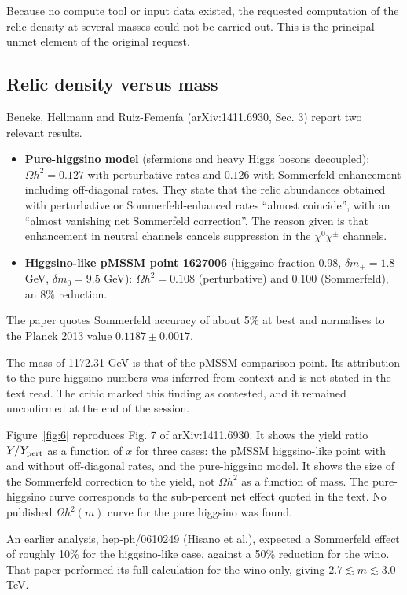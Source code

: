 \documentclass[11pt,a4paper]{article}
\begin{document}
Because no compute tool or input data existed, the requested computation of the relic density at several masses could not be carried out. This is the principal unmet element of the original request.

\subsection{Relic density versus mass}
Beneke, Hellmann and Ruiz-Femen\'ia (arXiv:1411.6930, Sec. 3) report two relevant results.
\begin{itemize}
\item \textbf{Pure-higgsino model} (sfermions and heavy Higgs bosons decoupled): $\Omega h^2 = 0.127$ with perturbative rates and $0.126$ with Sommerfeld enhancement including off-diagonal rates. They state that the relic abundances obtained with perturbative or Sommerfeld-enhanced rates ``almost coincide'', with an ``almost vanishing net Sommerfeld correction''. The reason given is that enhancement in neutral channels cancels suppression in the $\chi^0\chi^\pm$ channels.
\item \textbf{Higgsino-like pMSSM point 1627006} (higgsino fraction 0.98, $\delta m_+ = 1.8$ GeV, $\delta m_0 = 9.5$ GeV): $\Omega h^2 = 0.108$ (perturbative) and $0.100$ (Sommerfeld), an 8\% reduction.
\end{itemize}
The paper quotes Sommerfeld accuracy of about 5\% at best and normalises to the Planck 2013 value $0.1187\pm0.0017$.

The mass of 1172.31 GeV is that of the pMSSM comparison point. Its attribution to the pure-higgsino numbers was inferred from context and is not stated in the text read. The critic marked this finding as contested, and it remained unconfirmed at the end of the session.






Figure~\ref{fig:6} reproduces Fig. 7 of arXiv:1411.6930. It shows the yield ratio $Y/Y_{\rm pert}$ as a function of $x$ for three cases: the pMSSM higgsino-like point with and without off-diagonal rates, and the pure-higgsino model. It shows the size of the Sommerfeld correction to the yield, not $\Omega h^2$ as a function of mass. The pure-higgsino curve corresponds to the sub-percent net effect quoted in the text. No published $\Omega h^2(m)$ curve for the pure higgsino was found.

An earlier analysis, hep-ph/0610249 (Hisano et al.), expected a Sommerfeld effect of roughly 10\% for the higgsino-like case, against a 50\% reduction for the wino. That paper performed its full calculation for the wino only, giving $2.7\lesssim m\lesssim 3.0$ TeV.
\end{document}

